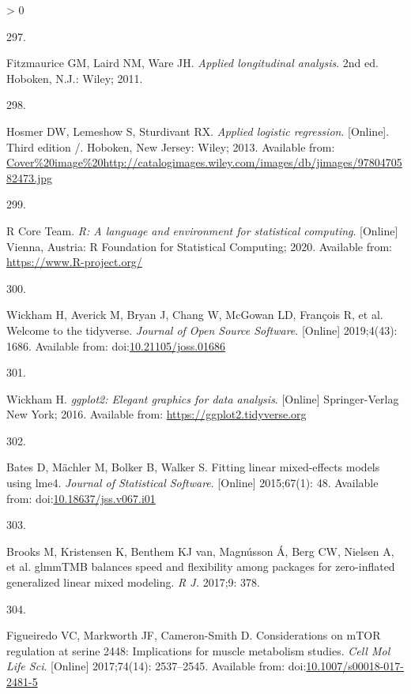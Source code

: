 \documentclass[twoside,10pt]{gihclass} %
\newlength{\cslhangindent}
\newlength{\csllabelwidth}
\newenvironment{CSLReferences}[3] %
 {%
  \setlength{\parindent}{0pt}
  \ifodd #1 \everypar{\setlength{\hangindent}{\cslhangindent}}\ignorespaces\fi
  \ifnum #2 > 0
  \setlength{\parskip}{#2\baselineskip}
  \fi
 }%
 {}
\newcommand{\CSLLeftMargin}[1]{\parbox[t]{\maxof{\widthof{#1}}{\csllabelwidth}}{#1}}
\newcommand{\CSLRightInline}[1]{\parbox[t]{\linewidth}{#1}}
\begin{document}
\begin{CSLReferences}{0}{0}
\leavevmode\hypertarget{ref-RN2332}{}%
\CSLLeftMargin{297. }
\CSLRightInline{Fitzmaurice GM, Laird NM, Ware JH. \emph{Applied longitudinal analysis}. 2nd ed. Hoboken, N.J.: Wiley; 2011. }

\leavevmode\hypertarget{ref-RN1998}{}%
\CSLLeftMargin{298. }
\CSLRightInline{Hosmer DW, Lemeshow S, Sturdivant RX. \emph{Applied logistic regression}. {[}Online{]}. Third edition /. Hoboken, New Jersey: Wiley; 2013. Available from: \url{Cover\%20image\%20http://catalogimages.wiley.com/images/db/jimages/9780470582473.jpg}}

\leavevmode\hypertarget{ref-rtats}{}%
\CSLLeftMargin{299. }
\CSLRightInline{R Core Team. \emph{R: A language and environment for statistical computing}. {[}Online{]} Vienna, Austria: R Foundation for Statistical Computing; 2020. Available from: \url{https://www.R-project.org/}}

\leavevmode\hypertarget{ref-tidyverse}{}%
\CSLLeftMargin{300. }
\CSLRightInline{Wickham H, Averick M, Bryan J, Chang W, McGowan LD, François R, et al. Welcome to the {tidyverse}. \emph{Journal of Open Source Software}. {[}Online{]} 2019;4(43): 1686. Available from: doi:\href{https://doi.org/10.21105/joss.01686}{10.21105/joss.01686}}

\leavevmode\hypertarget{ref-ggplot2}{}%
\CSLLeftMargin{301. }
\CSLRightInline{Wickham H. \emph{ggplot2: Elegant graphics for data analysis}. {[}Online{]} Springer-Verlag New York; 2016. Available from: \url{https://ggplot2.tidyverse.org}}

\leavevmode\hypertarget{ref-RN1819}{}%
\CSLLeftMargin{302. }
\CSLRightInline{Bates D, Mächler M, Bolker B, Walker S. Fitting linear mixed-effects models using lme4. \emph{Journal of Statistical Software}. {[}Online{]} 2015;67(1): 48. Available from: doi:\href{https://doi.org/10.18637/jss.v067.i01}{10.18637/jss.v067.i01}}

\leavevmode\hypertarget{ref-RN2626}{}%
\CSLLeftMargin{303. }
\CSLRightInline{Brooks M, Kristensen K, Benthem KJ van, Magnússon Á, Berg CW, Nielsen A, et al. glmmTMB balances speed and flexibility among packages for zero-inflated generalized linear mixed modeling. \emph{R J.} 2017;9: 378. }

\leavevmode\hypertarget{ref-RN2309}{}%
\CSLLeftMargin{304. }
\CSLRightInline{Figueiredo VC, Markworth JF, Cameron-Smith D. Considerations on mTOR regulation at serine 2448: Implications for muscle metabolism studies. \emph{Cell Mol Life Sci}. {[}Online{]} 2017;74(14): 2537--2545. Available from: doi:\href{https://doi.org/10.1007/s00018-017-2481-5}{10.1007/s00018-017-2481-5}}


\end{CSLReferences}
\end{document}
